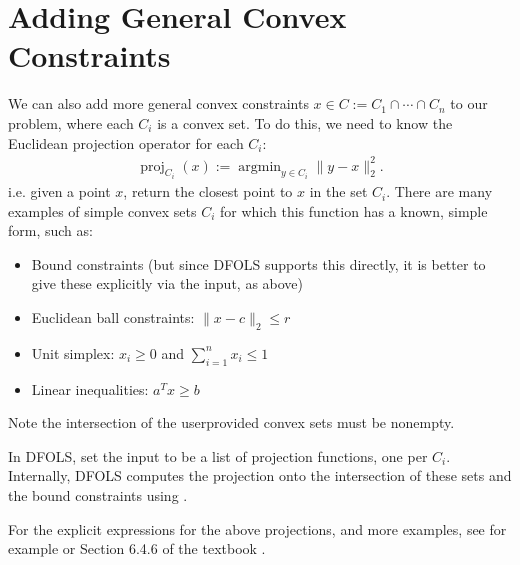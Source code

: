 \documentclass[letterpaper,10pt,english]{sphinxmanual}
\begin{document}
\section{Adding General Convex Constraints}
\label{\detokenize{userguide:adding-general-convex-constraints}}
\sphinxAtStartPar
We can also add more general convex constraints \(x \in C := C_1 \cap \cdots \cap C_n\) to our problem, where
each \(C_i\) is a convex set. To do this, we need to know the Euclidean projection operator for each \(C_i\):
\begin{equation*}
\begin{split}\operatorname{proj}_{C_i}(x) := \operatorname{argmin}_{y\in C_i} \|y-x\|_2^2.\end{split}
\end{equation*}
\sphinxAtStartPar
i.e. given a point \(x\), return the closest point to \(x\) in the set \(C_i\).
There are many examples of simple convex sets \(C_i\) for which this function has a known, simple form, such as:
\begin{itemize}
\item {} 
\sphinxAtStartPar
Bound constraints (but since DFO\sphinxhyphen{}LS supports this directly, it is better to give these explicitly via the  input, as above)

\item {} 
\sphinxAtStartPar
Euclidean ball constraints: \(\|x-c\|_2 \leq r\)

\item {} 
\sphinxAtStartPar
Unit simplex: \(x_i \geq 0\) and \(\sum_{i=1}^{n} x_i \leq 1\)

\item {} 
\sphinxAtStartPar
Linear inequalities: \(a^T x \geq b\)

\end{itemize}

\sphinxAtStartPar
Note the intersection of the user\sphinxhyphen{}provided convex sets must be non\sphinxhyphen{}empty.

\sphinxAtStartPar
In DFO\sphinxhyphen{}LS, set the input  to be a list of projection functions, one per \(C_i\).
Internally, DFO\sphinxhyphen{}LS computes the projection onto the intersection of these sets and the bound constraints
using .

\sphinxAtStartPar
For the explicit expressions for the above projections, and more examples, see for example 
or Section 6.4.6 of the textbook .
\end{document}
